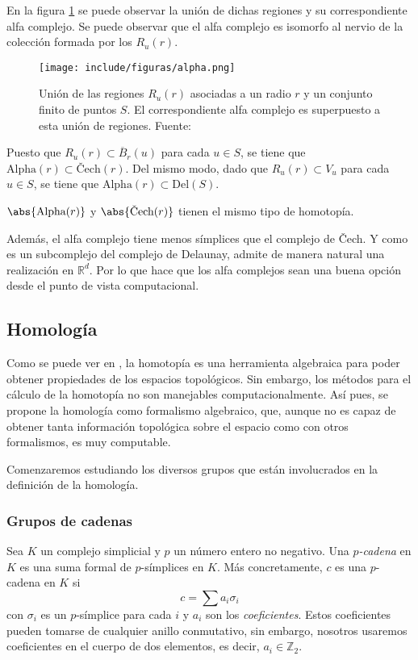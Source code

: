 En la figura \ref{ref:alpha} se puede observar la unión de dichas regiones y su correspondiente alfa complejo. Se puede observar que el alfa complejo es isomorfo al nervio de la colección formada por los $R_u(r)$.

\begin{figure}[!ht]
\centering
\texttt{[image: include/figuras/alpha.png]} 
\caption{Unión de las regiones $R_u(r)$ asociadas a un radio $r$ y un conjunto finito de puntos $S$. El correspondiente alfa complejo es superpuesto a esta unión de regiones. Fuente: \cite{libroEH}}
\label{ref:alpha}
\end{figure}

Puesto que $R_u(r) \subset \overline{B}_r(u)$ para cada $u \in S$, se tiene que $\text{Alpha}(r) \subset \text{\v{C}ech}(r)$. Del mismo modo, dado que $R_u(r) \subset V_u$ para cada $u \in S$, se tiene que $\text{Alpha}(r) \subset \text{Del}(S)$.

\begin{property}
$\abs{\text{\rm Alpha}(r)}$ y $\abs{\text{\rm \v{C}ech}(r)}$ tienen el mismo tipo de homotopía.
\end{property}

Además, el alfa complejo tiene menos símplices que el complejo de \v{C}ech. Y como es un subcomplejo del complejo de Delaunay, admite de manera natural una realización en $\mathbb{R}^d$. Por lo que hace que los alfa complejos sean una buena opción desde el punto de vista computacional.

\subsection{Homología}
Como se puede ver en \cite{Hatcher}, la homotopía es una herramienta algebraica para poder obtener propiedades de los espacios topológicos. Sin embargo, los métodos para el cálculo de la homotopía no son manejables computacionalmente. Así pues, se propone la homología como formalismo algebraico, que, aunque no es capaz de obtener tanta información topológica sobre el espacio como con otros formalismos, es muy computable.

Comenzaremos estudiando los diversos grupos que están involucrados en la definición de la homología.

\subsubsection*{Grupos de cadenas}
Sea $K$ un complejo simplicial y $p$ un número entero no negativo. Una \emph{$p$-cadena} en $K$ es una suma formal de $p$-símplices en $K$. Más concretamente, $c$ es una $p$-cadena en $K$ si
\[
c = \sum a_i\sigma_i
\]
con $\sigma_i$ es un $p$-símplice para cada $i$ y $a_i$ son los \emph{coeficientes}. Estos coeficientes pueden tomarse de cualquier anillo conmutativo, sin embargo, nosotros usaremos coeficientes en el cuerpo de dos elementos, es decir, $a_i \in \mathbb{Z}_2$. 

